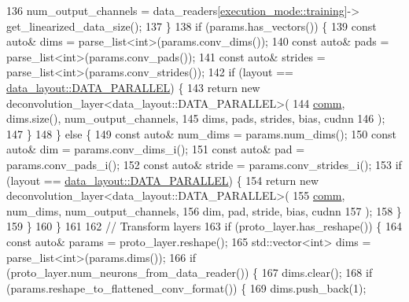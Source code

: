 \begin{DoxyCode}
136       num\_output\_channels = data\_readers[\hyperlink{base_8hpp_a2781a159088df64ed7d47cc91c4dc0a8ac185ddac8b5a8f5aa23c5b80bc12d214}{execution\_mode::training}]->
      get\_linearized\_data\_size();
137     \}
138     \textcolor{keywordflow}{if} (params.has\_vectors()) \{
139       \textcolor{keyword}{const} \textcolor{keyword}{auto}& dims = parse\_list<int>(params.conv\_dims());
140       \textcolor{keyword}{const} \textcolor{keyword}{auto}& pads = parse\_list<int>(params.conv\_pads());
141       \textcolor{keyword}{const} \textcolor{keyword}{auto}& strides = parse\_list<int>(params.conv\_strides());
142       \textcolor{keywordflow}{if} (layout == \hyperlink{base_8hpp_a786677cbfb3f5677b4d84f3056eb08dba37d2a3465f7cbf4ab60f4e79944d0638}{data\_layout::DATA\_PARALLEL}) \{
143         \textcolor{keywordflow}{return} \textcolor{keyword}{new} deconvolution\_layer<data\_layout::DATA\_PARALLEL>(
144                      \hyperlink{file__io_8cpp_ab048c6f9fcbcfaa57ce68b00263dbebe}{comm}, dims.size(), num\_output\_channels,
145                      dims, pads, strides, bias, cudnn
146                    );
147       \}
148     \} \textcolor{keywordflow}{else} \{
149       \textcolor{keyword}{const} \textcolor{keyword}{auto}& num\_dims = params.num\_dims();
150       \textcolor{keyword}{const} \textcolor{keyword}{auto}& dim = params.conv\_dims\_i();
151       \textcolor{keyword}{const} \textcolor{keyword}{auto}& pad = params.conv\_pads\_i();
152       \textcolor{keyword}{const} \textcolor{keyword}{auto}& stride = params.conv\_strides\_i();
153       \textcolor{keywordflow}{if} (layout == \hyperlink{base_8hpp_a786677cbfb3f5677b4d84f3056eb08dba37d2a3465f7cbf4ab60f4e79944d0638}{data\_layout::DATA\_PARALLEL}) \{
154         \textcolor{keywordflow}{return} \textcolor{keyword}{new} deconvolution\_layer<data\_layout::DATA\_PARALLEL>(
155                      \hyperlink{file__io_8cpp_ab048c6f9fcbcfaa57ce68b00263dbebe}{comm}, num\_dims, num\_output\_channels,
156                      dim, pad, stride, bias, cudnn
157                    );
158       \}
159     \}
160   \}
161 
162   \textcolor{comment}{// Transform layers}
163   \textcolor{keywordflow}{if} (proto\_layer.has\_reshape()) \{
164     \textcolor{keyword}{const} \textcolor{keyword}{auto}& params = proto\_layer.reshape();
165     std::vector<int> dims = parse\_list<int>(params.dims());
166     \textcolor{keywordflow}{if} (proto\_layer.num\_neurons\_from\_data\_reader()) \{
167       dims.clear();
168       \textcolor{keywordflow}{if} (params.reshape\_to\_flattened\_conv\_format()) \{
169         dims.push\_back(1);

\end{DoxyCode}
